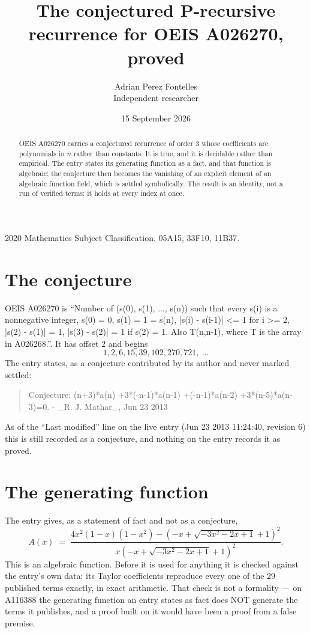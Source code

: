 \documentclass[11pt,a4paper]{article}
\title{The conjectured P-recursive recurrence for OEIS A026270, proved}
\author{Adrian Perez Fontelles\\ \small Independent researcher}
\date{15 September 2026}
\theoremstyle{plain}
\theoremstyle{definition}
\begin{document}
\maketitle

\begin{abstract}
OEIS A026270 carries a conjectured recurrence of order $3$ whose coefficients are polynomials in
$n$ rather than constants. It is true, and it is decidable rather than empirical. The entry
states its generating function as a fact, and that function is algebraic; the conjecture then
becomes the vanishing of an explicit element of an algebraic function field, which is settled
symbolically. The result is an identity, not a run of verified terms: it holds at every index
at once.
\end{abstract}

\noindent\small 2020 Mathematics Subject Classification. 05A15, 33F10, 11B37.\normalsize

\section{The conjecture}

OEIS A026270 is ``Number of (s(0), s(1), ..., s(n)) such that every s(i) is a nonnegative integer, s(0) = 0, s(1) = 1 = s(n), |s(i) - s(i-1)| <= 1 for i >= 2, |s(2) - s(1)| = 1, |s(3) - s(2)| = 1 if s(2) = 1. Also T(n,n-1), where T is the array in A026268.''. It has offset $2$ and begins
\[
1, 2, 6, 15, 39, 102, 270, 721,\ \dots
\]
The entry states, as a conjecture contributed by its author and never marked settled:
\begin{quote}\raggedright\small
Conjecture: (n+3)*a(n) +3*(-n-1)*a(n-1) +(-n-1)*a(n-2) +3*(n-5)*a(n-3)=0. - \_R. J. Mathar\_, Jun 23 2013
\end{quote}
As of the ``Last modified'' line on the live entry (Jun 23 2013 11:24:40, revision 6)
this is still recorded as a conjecture, and nothing on the entry records it as proved.

\section{The generating function}

The entry gives, as a statement of fact and not as a conjecture,
\[
A(x)\;=\;\frac{4 x^{2} \left(1 - x\right) \left(1 - x^{2}\right) - \left(- x + \sqrt{- 3 x^{2} - 2 x + 1} + 1\right)^{2}}{x \left(- x + \sqrt{- 3 x^{2} - 2 x + 1} + 1\right)^{2}} .
\]
This is an algebraic function. Before it is used for anything it is checked against the entry's
own data: its Taylor coefficients reproduce every one of the $29$ published terms
exactly, in exact arithmetic. That check is not a formality --- on A116388 the generating
function an entry states as fact does NOT generate the terms it publishes, and a proof built on
it would have been a proof from a false premise.
\end{document}
